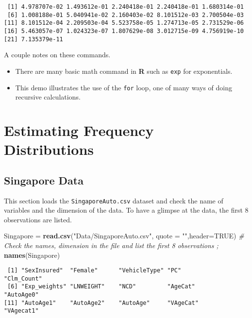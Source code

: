 \documentclass[]{book}
\newenvironment{Shaded}{\begin{snugshade}}{\end{snugshade}}
\newcommand{\KeywordTok}[1]{\textcolor[rgb]{0.13,0.29,0.53}{\textbf{#1}}}
\newcommand{\DataTypeTok}[1]{\textcolor[rgb]{0.13,0.29,0.53}{#1}}
\newcommand{\StringTok}[1]{\textcolor[rgb]{0.31,0.60,0.02}{#1}}
\newcommand{\CommentTok}[1]{\textcolor[rgb]{0.56,0.35,0.01}{\textit{#1}}}
\newcommand{\OtherTok}[1]{\textcolor[rgb]{0.56,0.35,0.01}{#1}}
\newcommand{\NormalTok}[1]{#1}
\providecommand{\tightlist}{%
  \setlength{\itemsep}{0pt}\setlength{\parskip}{0pt}}
\theoremstyle{definition}
\theoremstyle{definition}
\theoremstyle{definition}
\theoremstyle{remark}
\begin{document}
\begin{verbatim}
 [1] 4.978707e-02 1.493612e-01 2.240418e-01 2.240418e-01 1.680314e-01
 [6] 1.008188e-01 5.040941e-02 2.160403e-02 8.101512e-03 2.700504e-03
[11] 8.101512e-04 2.209503e-04 5.523758e-05 1.274713e-05 2.731529e-06
[16] 5.463057e-07 1.024323e-07 1.807629e-08 3.012715e-09 4.756919e-10
[21] 7.135379e-11
\end{verbatim}

A couple notes on these commands.

\begin{itemize}
\tightlist
\item
  There are many basic math command in \textbf{R} such as \texttt{exp}
  for exponentials.
\item
  This demo illustrates the use of the \texttt{for} loop, one of many
  ways of doing recursive calculations.
\end{itemize}

\section{Estimating Frequency
Distributions}\label{estimating-frequency-distributions}

\subsection{Singapore Data}\label{singapore-data}

This section loads the \texttt{SingaporeAuto.csv} dataset and check the
name of variables and the dimension of the data. To have a glimpse at
the data, the first 8 observations are listed.

\begin{Shaded}
\begin{Highlighting}[]
\NormalTok{Singapore =}\StringTok{ }\KeywordTok{read.csv}\NormalTok{(}\StringTok{"Data/SingaporeAuto.csv"}\NormalTok{,  }\DataTypeTok{quote =} \StringTok{""}\NormalTok{,}\DataTypeTok{header=}\OtherTok{TRUE}\NormalTok{)}
\CommentTok{#  Check the names, dimension in the file and list the first 8 observations ;}
\KeywordTok{names}\NormalTok{(Singapore)}
\end{Highlighting}
\end{Shaded}

\begin{verbatim}
 [1] "SexInsured"  "Female"      "VehicleType" "PC"          "Clm_Count"  
 [6] "Exp_weights" "LNWEIGHT"    "NCD"         "AgeCat"      "AutoAge0"   
[11] "AutoAge1"    "AutoAge2"    "AutoAge"     "VAgeCat"     "VAgecat1"   
\end{verbatim}
\end{document}
